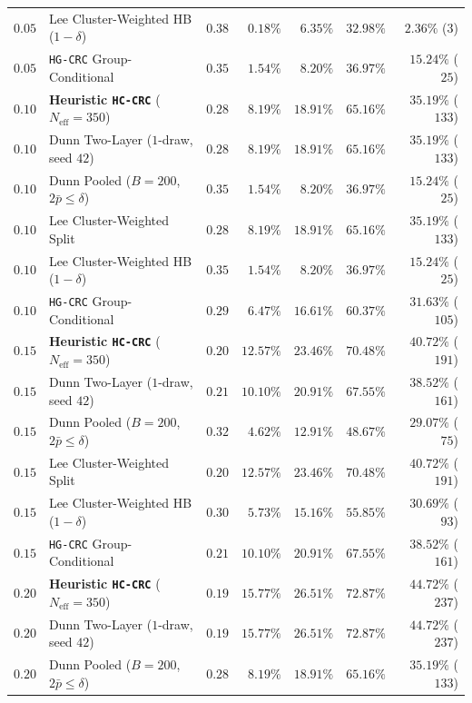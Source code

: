 \documentclass{article}
\begin{document}
\begin{table}[t]
\begin{center}
{\begin{tabular}{llrrrrr}
$0.05$ & Lee Cluster-Weighted HB ($1{-}\delta$) & $0.38$ & $0.18\%$ & $6.35\%$ & $32.98\%$ & $2.36\%$ ($3$) \\
$0.05$ & \texttt{HG-CRC} Group-Conditional & $0.35$ & $1.54\%$ & $8.20\%$ & $36.97\%$ & $15.24\%$ ($25$) \\
\midrule
$0.10$ & \textbf{Heuristic \texttt{HC-CRC}} ($N_{\text{eff}}{=}350$) & $0.28$ & $8.19\%$ & $18.91\%$ & $65.16\%$ & $35.19\%$ ($133$) \\
$0.10$ & Dunn Two-Layer ($1$-draw, seed $42$) & $0.28$ & $8.19\%$ & $18.91\%$ & $65.16\%$ & $35.19\%$ ($133$) \\
$0.10$ & Dunn Pooled ($B{=}200$, $2\bar{p} \le \delta$) & $0.35$ & $1.54\%$ & $8.20\%$ & $36.97\%$ & $15.24\%$ ($25$) \\
$0.10$ & Lee Cluster-Weighted Split & $0.28$ & $8.19\%$ & $18.91\%$ & $65.16\%$ & $35.19\%$ ($133$) \\
$0.10$ & Lee Cluster-Weighted HB ($1{-}\delta$) & $0.35$ & $1.54\%$ & $8.20\%$ & $36.97\%$ & $15.24\%$ ($25$) \\
$0.10$ & \texttt{HG-CRC} Group-Conditional & $0.29$ & $6.47\%$ & $16.61\%$ & $60.37\%$ & $31.63\%$ ($105$) \\
\midrule
$0.15$ & \textbf{Heuristic \texttt{HC-CRC}} ($N_{\text{eff}}{=}350$) & $0.20$ & $12.57\%$ & $23.46\%$ & $70.48\%$ & $40.72\%$ ($191$) \\
$0.15$ & Dunn Two-Layer ($1$-draw, seed $42$) & $0.21$ & $10.10\%$ & $20.91\%$ & $67.55\%$ & $38.52\%$ ($161$) \\
$0.15$ & Dunn Pooled ($B{=}200$, $2\bar{p} \le \delta$) & $0.32$ & $4.62\%$ & $12.91\%$ & $48.67\%$ & $29.07\%$ ($75$) \\
$0.15$ & Lee Cluster-Weighted Split & $0.20$ & $12.57\%$ & $23.46\%$ & $70.48\%$ & $40.72\%$ ($191$) \\
$0.15$ & Lee Cluster-Weighted HB ($1{-}\delta$) & $0.30$ & $5.73\%$ & $15.16\%$ & $55.85\%$ & $30.69\%$ ($93$) \\
$0.15$ & \texttt{HG-CRC} Group-Conditional & $0.21$ & $10.10\%$ & $20.91\%$ & $67.55\%$ & $38.52\%$ ($161$) \\
\midrule
$0.20$ & \textbf{Heuristic \texttt{HC-CRC}} ($N_{\text{eff}}{=}350$) & $0.19$ & $15.77\%$ & $26.51\%$ & $72.87\%$ & $44.72\%$ ($237$) \\
$0.20$ & Dunn Two-Layer ($1$-draw, seed $42$) & $0.19$ & $15.77\%$ & $26.51\%$ & $72.87\%$ & $44.72\%$ ($237$) \\
$0.20$ & Dunn Pooled ($B{=}200$, $2\bar{p} \le \delta$) & $0.28$ & $8.19\%$ & $18.91\%$ & $65.16\%$ & $35.19\%$ ($133$) \\

\end{tabular}}
\end{center}
\end{table}
\end{document}
